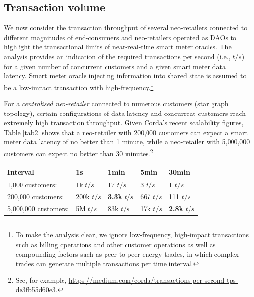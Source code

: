 \documentclass[a4paper,12pt,reqno]{amsart}
\theoremstyle{definition}
\begin{document}
\enlargethispage{-0.5\baselineskip}

\subsection*{Transaction volume}
We now consider the transaction throughput of several neo-retailers connected to different magnitudes of end-consumers and neo-retailers operated as DAOs to highlight the transactional limits of near-real-time smart meter oracles. The analysis provides an indication of the required transactions per second (i.e., $t/s$) for a given number of concurrent customers and a given smart meter data latency. Smart meter oracle injecting information into shared state is assumed to be a low-impact transaction with high-frequency.\footnote{ To make the analysis clear, we ignore low-frequency, high-impact transactions such as billing operations and other customer operations as well as compounding factors such as peer-to-peer energy trades, in which complex trades can generate multiple transactions per time interval.} 

For a \textit{centralised neo-retailer} connected to numerous customers (star graph topology), certain configurations of data latency and concurrent customers reach extremely high transaction throughput. Given Corda's recent scalability figures, Table \ref{tab2} shows that a neo-retailer with 200,000 customers can expect a smart meter data latency of no better than 1 minute, while a neo-retailer with 5,000,000 customers can expect no better than 30 minutes.\footnote{ See, for example, \textcolor{blue}{\href{https://medium.com/corda/transactions-per-second-tps-de3fb55d60e3}{https://medium.com/corda/transactions-per-second-tps-de3fb55d60e3}}.}
\vspace{+1em}
\begin{center}
\begin{tabular}{|l|l|l|l|l|}
 \hline 	
 \textbf{Interval} 		& \textbf{1s} & \textbf{1min} & \textbf{5min} & \textbf{30min}\\
 \hline 
 \hline
 1,000 customers:		& 1k $t/s$	& 17 $t/s$	& 3 $t/s$		& 1 $t/s$ \\
 200,000 customers:		& 200k $t/s$	& \textbf{3.3k} $t/s$	& 667 $t/s$	& 111 $t/s$ \\
 5,000,000 customers:	& 5M $t/s$	& 83k $t/s$	& 17k $t/s$	& \textbf{2.8k} $t/s$ \\
 \hline
\end{tabular}
\vspace{+1em}

\label{tab2}
\end{center}
\end{document}
